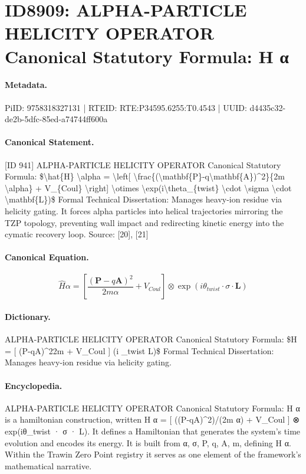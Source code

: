 \section*{ID8909: ALPHA-PARTICLE HELICITY OPERATOR Canonical Statutory Formula: H α}
\paragraph{Metadata.}
PiID: 9758318327131 | RTEID: RTE:P34595.6255:T0.4543 | UUID: d4435c32-de2b-5dfc-85ed-a74744ff600a

\paragraph{Canonical Statement.}
[ID 941] ALPHA-PARTICLE HELICITY OPERATOR Canonical Statutory Formula: \$\textbackslash{}hat\{H\} \textbackslash{}alpha = \textbackslash{}left[ \textbackslash{}frac\{(\textbackslash{}mathbf\{P\}-q\textbackslash{}mathbf\{A\})\textasciicircum{}2\}\{2m \textbackslash{}alpha\} + V\_\{Coul\} \textbackslash{}right] \textbackslash{}otimes \textbackslash{}exp(i\textbackslash{}theta\_\{twist\} \textbackslash{}cdot \textbackslash{}sigma \textbackslash{}cdot \textbackslash{}mathbf\{L\})\$ Formal Technical Dissertation: Manages heavy-ion residue via helicity gating. It forces alpha particles into helical trajectories mirroring the TZP topology, preventing wall impact and redirecting kinetic energy into the cymatic recovery loop. Source: [20], [21]

\paragraph{Canonical Equation.}
\[
\hat{H} \alpha = \left[ \frac{(\mathbf{P}-q\mathbf{A})^2}{2m \alpha} + V_{Coul} \right] \otimes \exp(i\theta_{twist} \cdot \sigma \cdot \mathbf{L})
\]

\paragraph{Dictionary.}
ALPHA-PARTICLE HELICITY OPERATOR Canonical Statutory Formula: \$H = [ (P-qA)\textasciicircum{}22m + V\_Coul ] (i \_twist L)\$ Formal Technical Dissertation: Manages heavy-ion residue via helicity gating.

\paragraph{Encyclopedia.}
ALPHA-PARTICLE HELICITY OPERATOR Canonical Statutory Formula: H α is a hamiltonian construction, written H α = [ ((P-qA)\textasciicircum{}2)/(2m α) + V\_Coul ] ⊗ exp(iθ\_twist · σ · L). It defines a Hamiltonian that generates the system's time evolution and encodes its energy. It is built from α, σ, P, q, A, m, defining H α. Within the Trawin Zero Point registry it serves as one element of the framework's mathematical narrative.
